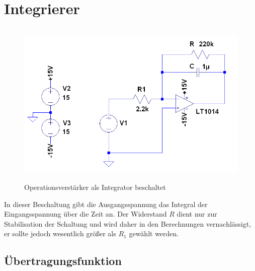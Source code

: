 
\section{Integrierer}

\begin{figure}[H]
 \centering
 \includegraphics[height=8cm,width=12cm]{Simulationen/Integrator}
 \caption{Operationsverstärker als Integrator beschaltet}
\end{figure}
\noindent
In dieser Beschaltung gibt die Ausgangsspannung das Integral der Eingangsspannung über die Zeit an. Der Widerstand $R$ dient nur zur Stabilisation
der Schaltung und wird daher in den Berechnungen vernachlässigt, er sollte jedoch wesentlich größer als $R_1$ gewählt werden.

\subsection{Übertragungsfunktion}

